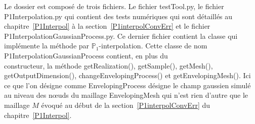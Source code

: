 Le dossier est composé de trois fichiers. Le fichier testTool.py,
le fichier P1Interpolation.py qui contient des tests numériques qui sont détaillés
au chapitre~\ref{P1Interpol} à la section~\ref{P1interpolConvErr} et le fichier P1InterpolationGaussianProcess.py.
Ce dernier fichier contient la classe qui implémente la méthode par $\mathbb{P}_{1}$-interpolation.
Cette classe de nom P1InterpolationGaussianProcess contient, en plus du \\constructeur, la méthode
getRealization(), getSample(), getMesh(), getOutputDimension(), changeEnvelopingProcess()
et getEnvelopingMesh(). Ici ce que l'on désigne comme EnvelopingProcess désigne le champ gaussien simulé au niveau des n\oe uds du maillage EnvelopingMesh
qui n'est rien d'autre que le maillage $M$ évoqué au début de la section~\ref{P1interpolConvErr} du chapitre~\ref{P1Interpol}.
